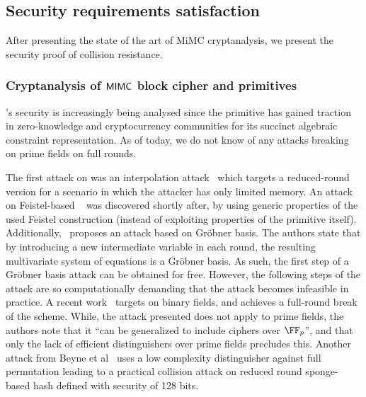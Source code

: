 \subsection{Security requirements satisfaction}\label{instantiation:mkhash:security}

After presenting the state of the art of MiMC cryptanalysis, we present the security proof of \mimcMPPrime{} collision resistance.

\subsubsection{Cryptanalysis of $\mathsf{MIMC{}}$ block cipher and primitives}\label{instantiation:mkhash:security:cryptanalysis}

\mimc{}'s security is increasingly being analysed since the primitive has gained traction in zero-knowledge and cryptocurrency communities for its succinct algebraic constraint representation. As of today, we do not know of any attacks breaking \mimc{} on prime fields on full rounds.

The first attack on \mimc{} was an interpolation attack~\cite{li2019improved} which targets a reduced-round version for a scenario in which the attacker has only limited memory.
An attack on Feistel-based \mimc{}~\cite{bonnetain2019collisions} was discovered shortly after, by using generic properties of the used Feistel construction (instead of exploiting properties of the primitive itself).
Additionally,~\cite{albrecht2019algebraic} proposes an attack based on Gr\"{o}bner basis. The authors state that by introducing a new intermediate variable in each round, the resulting multivariate system of equations is a Gr\"{o}bner basis. As such, the first step of a Gr\"{o}bner basis attack can be obtained for free. However, the following steps of the attack are so computationally demanding that the attack becomes infeasible in practice.
A recent work~\cite{DBLP:conf/asiacrypt/Eichlseder0LORS20} targets \mimc{} on binary fields, and achieves a full-round break of the scheme. While, the attack presented does not apply to prime fields, the authors note that it ``can be generalized to include ciphers over $\FFx{p}$'', and that only the lack of efficient distinguishers over prime fields precludes this.
Another attack from Beyne et al~\cite{cryptoeprint:2020:188} uses a low complexity distinguisher against full \mimc{} permutation leading to a practical collision attack on reduced round sponge-based \mimc{} hash defined with security of 128 bits.

